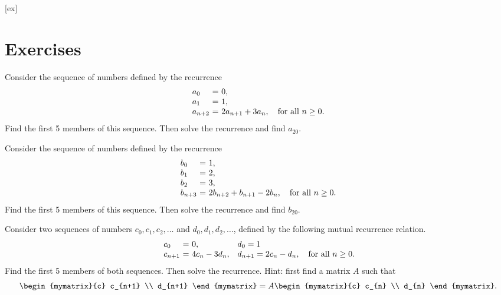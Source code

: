 [ex]
\section*{Exercises}

\begin{enumialphparenastyle}

\begin{ex}
  Consider the sequence of numbers defined by the recurrence
  \begin{equation*}
    \begin{array}{l@{~}c@{~}l}
      a_0 &=& 0, \\
      a_1 &=& 1, \\
      a_{n+2} &=& 2a_{n+1} + 3a_{n}, \quad\mbox{for all $n\geq 0$.}\\
    \end{array}
  \end{equation*}
  Find the first 5 members of this sequence. Then solve the recurrence
  and find $a_{20}$.
\end{ex}
  
\begin{ex}
  Consider the sequence of numbers defined by the recurrence
  \begin{equation*}
    \begin{array}{l@{~}c@{~}l}
      b_0 &=& 1, \\
      b_1 &=& 2, \\
      b_2 &=& 3, \\
      b_{n+3} &=& 2b_{n+2} + b_{n+1} - 2b_{n}, \quad\mbox{for all $n\geq 0$.}\\
    \end{array}
  \end{equation*}
  Find the first 5 members of this sequence. Then solve the recurrence
  and find $b_{20}$.
\end{ex}

\begin{ex}
  Consider two sequences of numbers $c_0,c_1,c_2,\ldots$ and
  $d_0,d_1,d_2,\ldots$, defined by the following mutual recurrence
  relation.
  \begin{equation*}
    \begin{array}{l@{~}c@{~}l@{\quad}l@{~}c@{~}l}
      c_0 &=& 0,             & d_0 = 1 \\
      c_{n+1} &=& 4c_n - 3d_n, & d_{n+1} = 2c_n - d_n, \quad\mbox{for all $n\geq 0$.}\\
    \end{array}
  \end{equation*}
  Find the first 5 members of both sequences. Then solve the
  recurrence. Hint: first find a matrix $A$ such that
  \begin{equation*}
    \begin{mymatrix}{c} c_{n+1} \\ d_{n+1} \end{mymatrix}
    = A \begin{mymatrix}{c} c_{n} \\ d_{n} \end{mymatrix}.
  \end{equation*}
\end{ex}  
  
\end{enumialphparenastyle}
